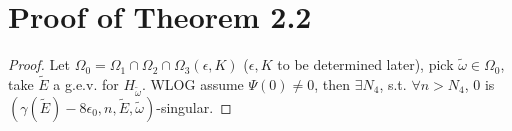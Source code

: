 \section{Proof of Theorem 2.2}
\begin{proof}
Let $\Omega_0=\Omega_1\cap\Omega_2\cap\Omega_3(\epsilon,K)$  ($\epsilon,K$ to be determined later), pick $\tilde{\omega}\in\Omega_0$, take $\tilde{E}$ a g.e.v. for $H_{\tilde{\omega}}$.
WLOG assume $\Psi(0)\neq 0$, then $\exists N_4$, s.t. $\forall n>N_4$, 0 is $(\gamma(\tilde{E})-8\epsilon_0,n,\tilde{E},\tilde{\omega})$-singular.



\end{proof}
